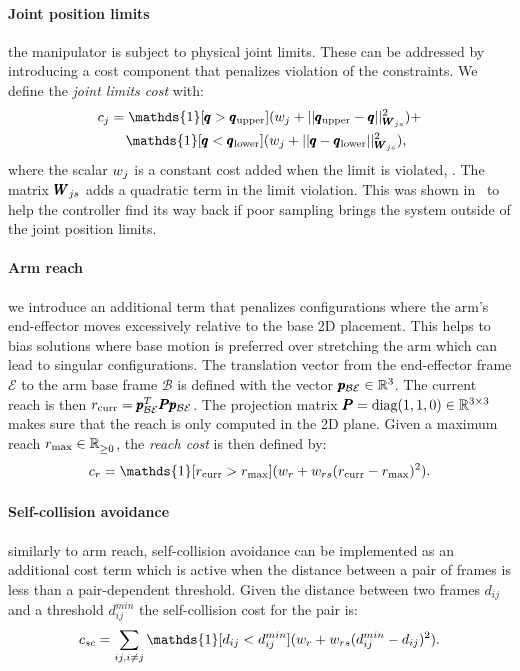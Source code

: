  \paragraph{Joint position limits} the manipulator is subject to physical joint limits. These can be addressed by introducing a cost component that penalizes violation of the constraints. We define the \textit{joint limits cost} with:
 \begin{align}
     &c_{j} = \mathds{1}[\configRobot > \upperLimits](\weightScalar{j} + ||\upperLimits - \configRobot||^2_{\weightMatrix{js}}) + \nonumber\\ 
     &\qquad\mathds{1}[\configRobot < \lowerLimits](\weightScalar{j} +  || \configRobot - \lowerLimits||^2_{\weightMatrix{js}}), 
 \end{align}
 where the scalar $w_{j}$ is a constant cost added when the limit is violated, . The matrix $\pmb{W}_{js}$ adds a quadratic term in the limit violation. This was shown in~\cite{williams_information-theoretic_2018} to help the controller find its way back if poor sampling brings the system outside of the joint position limits.
 
 \paragraph{Arm reach} we introduce an additional term that penalizes configurations where the arm's end-effector moves excessively relative to the base 2D placement. This helps to bias solutions where base motion is preferred over stretching the arm which can lead to singular configurations. The translation vector from the end-effector frame $\mathcal{E}$ to the arm base frame $\mathcal{B}$ is defined with the vector $\pmb{p}_{\mathcal{B}\mathcal{E}} \in \mathbb{R}^{3}$. The current reach is then $r_{\text{curr}} =  \pmb{p}_{\mathcal{B}\mathcal{E}}^T \pmb{P} \pmb{p}_{\mathcal{B}\mathcal{E}}$. The projection matrix $\pmb{P} = \text{diag}(1, 1, 0) \in \mathbb{R}^{3 \times 3}$ makes sure that the reach is only computed in the 2D plane. Given a maximum reach $r_{\text{max}} \in \mathbb{R}^{}_{\geq 0}$, the \textit{reach cost} is then defined by:
 \begin{equation}
   c_r = \mathds{1}[r_{\text{curr}} > r_{\text{max}}] (\weightScalar{r} + \weightScalar{rs}(r_{\text{curr}} - r_{\text{max}})^2).    
 \end{equation}

 \paragraph{Self-collision avoidance} similarly to arm reach, self-collision avoidance can be implemented as an additional cost term which is active when the distance between a pair of frames is less than a pair-dependent threshold. Given the distance between two frames $d_{ij}$ and a threshold $d^{min}_{ij}$ the self-collision cost for the pair is:
 \begin{equation}
   c_{sc} = \sum_{ij, i \neq j} \mathds{1}[d_{ij} < d^{min}_{ij}] (\weightScalar{r} + \weightScalar{rs}(d^{min}_{ij} - d_{ij})^2).    
 \end{equation}
 
